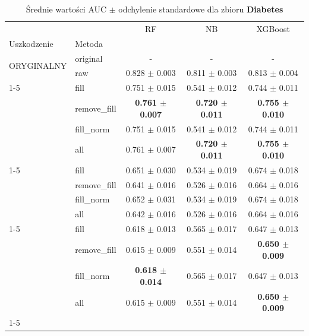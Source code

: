 \begin{table}[htbp]
\caption{Średnie wartości AUC $\pm$ odchylenie standardowe dla zbioru \textbf{Diabetes}}
\label{tab:wyniki_diabetes}
\begin{tabular}{llccc}
\toprule
 &  & RF & NB & XGBoost \\
Uszkodzenie & Metoda &  &  &  \\
\midrule
\multirow[t]{2}{*}{ORYGINALNY} & original & - & - & - \\
 & raw & 0.828 $\pm$ 0.003 & 0.811 $\pm$ 0.003 & 0.813 $\pm$ 0.004 \\
\cline{1-5}
\multirow[t]{5}{*}{20%
 & fill & 0.751 $\pm$ 0.015 & 0.541 $\pm$ 0.012 & 0.744 $\pm$ 0.011 \\
 & remove_fill & \textbf{0.761 $\pm$ 0.007} & \textbf{0.720 $\pm$ 0.011} & \textbf{0.755 $\pm$ 0.010} \\
 & fill_norm & 0.751 $\pm$ 0.015 & 0.541 $\pm$ 0.012 & 0.744 $\pm$ 0.011 \\
 & all & 0.761 $\pm$ 0.007 & \textbf{0.720 $\pm$ 0.011} & \textbf{0.755 $\pm$ 0.010} \\
\cline{1-5}
\multirow[t]{5}{*}{40%
 & fill & 0.651 $\pm$ 0.030 & 0.534 $\pm$ 0.019 & 0.674 $\pm$ 0.018 \\
 & remove_fill & 0.641 $\pm$ 0.016 & 0.526 $\pm$ 0.016 & 0.664 $\pm$ 0.016 \\
 & fill_norm & 0.652 $\pm$ 0.031 & 0.534 $\pm$ 0.019 & 0.674 $\pm$ 0.018 \\
 & all & 0.642 $\pm$ 0.016 & 0.526 $\pm$ 0.016 & 0.664 $\pm$ 0.016 \\
\cline{1-5}
\multirow[t]{5}{*}{60%
 & fill & 0.618 $\pm$ 0.013 & 0.565 $\pm$ 0.017 & 0.647 $\pm$ 0.013 \\
 & remove_fill & 0.615 $\pm$ 0.009 & 0.551 $\pm$ 0.014 & \textbf{0.650 $\pm$ 0.009} \\
 & fill_norm & \textbf{0.618 $\pm$ 0.014} & 0.565 $\pm$ 0.017 & 0.647 $\pm$ 0.013 \\
 & all & 0.615 $\pm$ 0.009 & 0.551 $\pm$ 0.014 & \textbf{0.650 $\pm$ 0.009} \\
\cline{1-5}
\bottomrule
\end{tabular}
\end{table}
